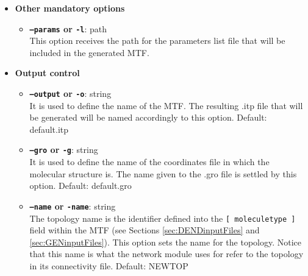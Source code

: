 \documentclass[12pt]{article}
\begin{document}
\begin{itemize}
  \item \textbf{Other mandatory options}
\begin{itemize}
  \item \textbf{\texttt{--params} or \texttt{-l}}: path\\
    This option receives the path for the parameters list file that will be included in the generated MTF.
\end{itemize}

  \item \textbf{Output control}
\begin{itemize}
  \item \textbf{\texttt{--output} or \texttt{-o}}: string\\
    It is used to define the name of the MTF. The resulting .itp file that will be generated will be named accordingly to this option. Default: default.itp
  \item \textbf{\texttt{--gro} or \texttt{-g}}: string\\
    It is used to define the name of the coordinates file in which the molecular structure is. The name given to the .gro file is settled by this option. Default: default.gro
  \item \textbf{\texttt{--name} or \texttt{-name}}: string\\
    The topology name is the identifier defined into the \texttt{[ moleculetype ]} field within the MTF (see Sections \ref{sec:DENDinputFiles} and \ref{sec:GENinputFiles}). This option sets the name for the topology. Notice that this name is what the network module uses for refer to the topology in its connectivity file. Default: NEWTOP
\end{itemize}


\end{itemize}
\end{document}
